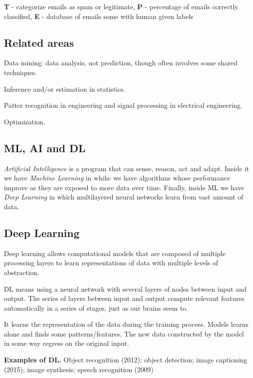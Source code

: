 \documentclass{article}
\begin{document}
\textbf{T} - categorize emails as spam or legitimate, \textbf{P} - percentage of emails correctly classified, \textbf{E} - database of emails some with human given labels


\subsection*{Related areas}
Data mining: data analysis, not prediction, though often involves some shared techniques. 

Inference and/or estimation in statistics.

Patter recognition in engineering and signal processing in electrical engineering.

 Optimization.
	

	

\subsection*{ML, AI and DL}

\emph{Artificial Intelligence} is a program that can sense, reason, act and adapt. Inside it we have \emph{Machine Learning} in whihc we have algorithms whose performance improve as they are exposed to more data over time. Finally, inside ML we have \emph{Deep Learning} in which multilayered neural networks learn from vast amount of data.


\subsection*{Deep Learning}

Deep learning allows computational models that are composed of multiple processing layers to learn representations of data with multiple levels of abstraction.

DL means using a neural network with several layers of nodes between input and output. The series of layers between input and output compute relevant features automatically in a series of stages, just as our brains seem to.

It learns the representation of the data during the training process. Models learns alone and finds some patterns/features. The new data constructed by the model in some way regress on the original input.

\bigskip

\textbf{Examples of DL. } Object recognition (2012); object detection; image captioning (2015); image synthesis; speech recognition (2009)
\end{document}
